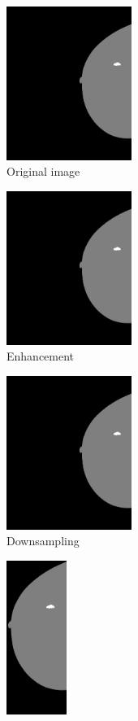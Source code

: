 \begin{figure}[h]
\begin{subfigure}{2.4 cm}
    \end{subfigure}
	\\
	\begin{subfigure}{4.2 cm}
		\centering
                \includegraphics[height = 5cm]{plots/label.png}
		\caption{Original image}
		\label{subfig:Preprocessinga}
    \end{subfigure}
	\begin{subfigure}{4.2 cm}
		\centering
                \includegraphics[height = 5cm]{plots/label_enhanced.png}
		\caption{Enhancement}
		\label{subfig:Preprocessingb}
    \end{subfigure}
	\begin{subfigure}{4.2 cm}
		\centering
                \includegraphics[height = 5cm]{plots/label_resized.png}
		\caption{Downsampling}
		\label{subfig:Preprocessingc}
    \end{subfigure}
	\begin{subfigure}{2.4 cm}
		\centering
		\includegraphics[height = 5cm]{plots/label_v1.png}

\end{subfigure}
\end{figure}
